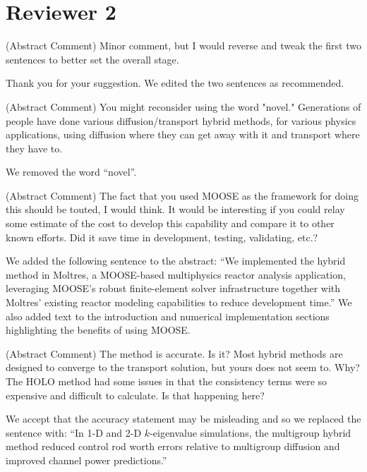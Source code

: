 \documentclass[answers,11pt]{exam}
\begin{document}
\section*{Reviewer 2}
\begin{questions}

    \question (Abstract Comment) Minor comment, but I would reverse and tweak the first two sentences to better set the overall stage.
    \begin{solution}
        Thank you for your suggestion. We edited the two sentences as recommended.
    \end{solution}

    \question (Abstract Comment) You might reconsider using the word "novel." Generations of people have done various diffusion/transport hybrid methods, for various physics applications, using diffusion where they can get away with it and transport where they have to.
    \begin{solution}
        We removed the word ``novel''.
    \end{solution}

    \question (Abstract Comment) The fact that you used MOOSE as the framework for doing this should be touted, I would think. It would be interesting if you could relay some estimate of the cost to develop this capability and compare it to other known efforts. Did it save time in development, testing, validating, etc.?
    \begin{solution}
        We added the following sentence to the abstract: ``We implemented the hybrid method in
        Moltres, a MOOSE-based multiphysics reactor analysis application, leveraging MOOSE's robust
        finite-element solver infrastructure together with Moltres' existing reactor modeling
        capabilities to reduce development time.'' We also added text to the introduction and
        numerical implementation sections highlighting the benefits of using MOOSE.
    \end{solution}

    \question (Abstract Comment) The method is accurate. Is it? Most hybrid methods are designed to converge to the transport solution, but yours does not seem to. Why? The HOLO method had some issues in that the consistency terms were so expensive and difficult to calculate. Is that happening here?
    \begin{solution}
        We accept that the accuracy statement may be misleading and so we replaced
        the sentence with:
        ``In 1-D and 2-D $k$-eigenvalue simulations, the multigroup hybrid method reduced control
        rod worth errors relative to multigroup diffusion and improved channel power predictions.''


\end{solution}
\end{questions}
\end{document}
